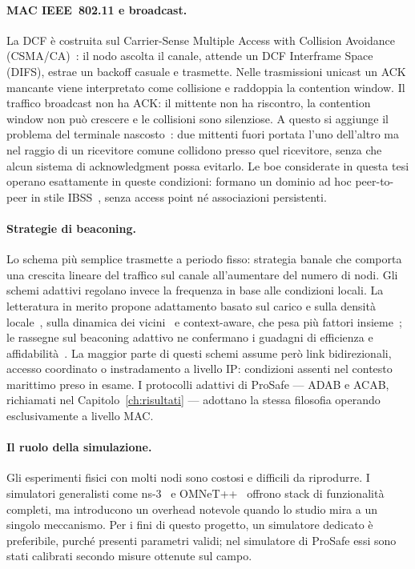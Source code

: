 \paragraph{MAC IEEE~802.11 e broadcast.}
La DCF \`e costruita sul Carrier-Sense Multiple Access with Collision
Avoidance (CSMA/CA)~\cite{sharetechnote-dcf,csma-ca}: il nodo ascolta il
canale, attende un DCF Interframe Space (DIFS), estrae un backoff casuale e
trasmette. Nelle trasmissioni unicast un ACK mancante viene interpretato come collisione e
raddoppia la contention window. Il traffico broadcast non ha ACK: il mittente non ha riscontro, la contention window non
pu\`o crescere e le collisioni sono silenziose. A questo si
aggiunge il problema del terminale nascosto~\cite{tobagi-hidden}: due mittenti
fuori portata l'uno dell'altro ma nel raggio di un ricevitore comune collidono
presso quel ricevitore, senza che alcun sistema di acknowledgment possa evitarlo. 
Le boe considerate in questa tesi operano esattamente in queste condizioni: 
formano un dominio ad hoc peer-to-peer in stile IBSS~\cite{ipcisco-ibss}, 
senza access point n\'e associazioni persistenti.

\paragraph{Strategie di beaconing.}
Lo schema pi\`u semplice trasmette a periodo fisso: strategia banale che comporta
una crescita lineare del traffico sul canale all'aumentare del numero di nodi. Gli
schemi adattivi regolano invece la frequenza in base alle condizioni locali.
La letteratura in merito propone adattamento basato sul carico e sulla densit\`a
locale~\cite{schmidt-adaptive}, sulla dinamica dei
vicini~\cite{alotaibi-adaptive} e context-aware, che pesa pi\`u fattori
insieme~\cite{sommer-adaptive}; le rassegne sul beaconing adattivo ne
confermano i guadagni di efficienza e affidabilit\`a~\cite{shah-survey}. La
maggior parte di questi schemi assume per\`o link bidirezionali, accesso
coordinato o instradamento a livello IP: condizioni assenti nel contesto marittimo preso in esame. 
I protocolli adattivi di ProSafe --- ADAB e ACAB, richiamati nel
Capitolo~\ref{ch:risultati} --- adottano la stessa filosofia operando
esclusivamente a livello MAC.

\paragraph{Il ruolo della simulazione.}
Gli esperimenti fisici con molti nodi sono costosi e difficili da riprodurre. 
I simulatori generalisti come ns-3~\cite{nsnam} e OMNeT++~\cite{omnetpp} offrono stack di funzionalit\`a
completi, ma introducono un overhead notevole quando lo studio mira a un singolo
meccanismo. Per i fini di questo progetto, un simulatore dedicato \`e preferibile, purch\'e presenti parametri validi; 
nel simulatore di ProSafe essi sono stati calibrati secondo misure ottenute sul campo.


